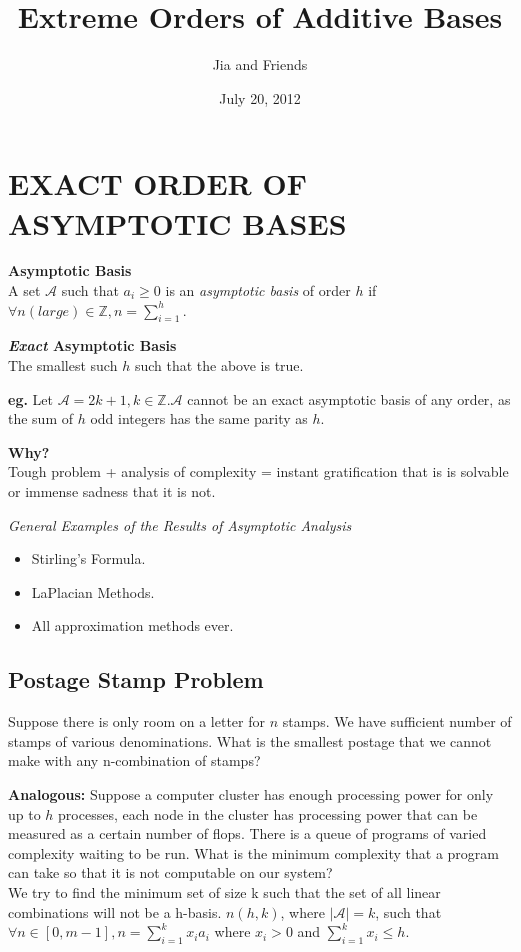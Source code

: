 \documentclass[a4paper,10pt,english]{sphinxhowto}
\title{Extreme Orders of Additive Bases}
\author{Jia and Friends}
\date{July 20, 2012}
\def\A{{\mathcal A}}
\def\ai{{a_{i}}}
\def\xi{{x_{i}}}
\begin{document}
\maketitle




\section*{EXACT ORDER OF ASYMPTOTIC BASES}
\label{index:asymptotic-bases}

\textbf{Asymptotic Basis}\\
A set $\A$ such that $\ai \geq 0$ is an \emph{asymptotic basis} of order $h$ if $ \forall n (large) \in \mathbb{Z}, n = \sum_{i=1}^h$.

\textbf{\emph{Exact} Asymptotic Basis}\\
The smallest such $h$ such that the above is true.

\textbf{eg.} Let $\A = {2k + 1, k \in \mathbb{Z} }. \A $ cannot be an exact asymptotic basis of any order, as the sum of $h$ odd integers has the same parity as $h$.

\textbf{Why?}\\
Tough problem + analysis of complexity = instant gratification that is is solvable or immense sadness that it is not.

\emph{General Examples of the Results of Asymptotic Analysis}
\begin{itemize}
\item Stirling's Formula.
\item LaPlacian Methods.
\item All approximation methods ever.
\end{itemize}

\subsection*{Postage Stamp Problem}
Suppose there is only room on a letter for $n$ stamps. We have sufficient number of stamps of various denominations. What is the smallest postage that we cannot make with any n-combination of stamps?

\textbf{Analogous:} Suppose a computer cluster has enough processing power for only up to $h$ processes, each node in the cluster has processing power that can be measured as a certain number of flops. There is a queue of programs of varied complexity waiting to be run.
What is the minimum complexity that a program can take so that it is not computable on our system?
\\
We try to find the minimum set of size k such that the set of all linear combinations will not be a h-basis.
$n(h, k)$, where $ \vert \A \vert = k$, such that $\forall n \in [0, m-1], n = \sum_{i=1}^k \xi \ai$ where $\xi > 0$ and $\sum_{i=1}^k \xi \leq h$.
\end{document}
